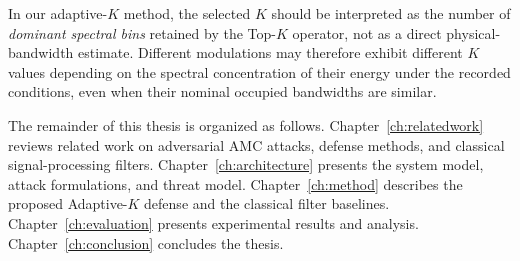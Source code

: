 In our adaptive-$K$ method, the selected $K$ should be interpreted as the
number of \emph{dominant spectral bins} retained by the Top-$K$ operator,
not as a direct physical-bandwidth estimate. Different modulations may
therefore exhibit different $K$ values depending on the spectral concentration
of their energy under the recorded conditions, even when their nominal
occupied bandwidths are similar.

The remainder of this thesis is organized as follows. Chapter~\ref{ch:relatedwork}
reviews related work on adversarial AMC attacks, defense methods, and classical
signal-processing filters. Chapter~\ref{ch:architecture} presents the system
model, attack formulations, and threat model. Chapter~\ref{ch:method}
describes the proposed Adaptive-$K$ defense and the classical filter
baselines. Chapter~\ref{ch:evaluation} presents experimental results and
analysis. Chapter~\ref{ch:conclusion} concludes the thesis.
